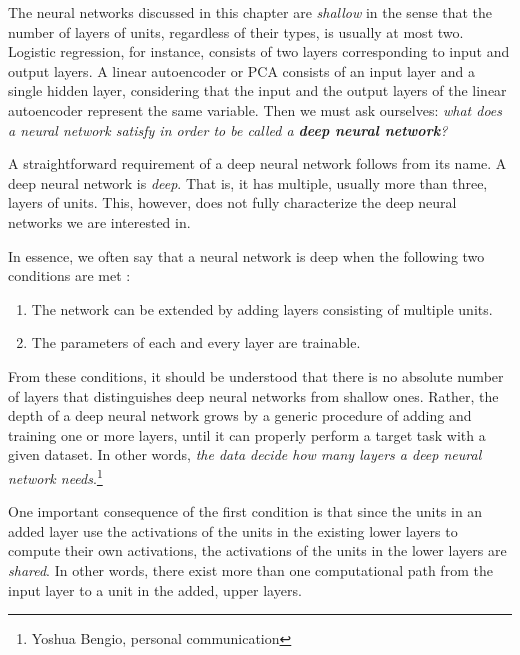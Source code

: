\documentclass[dissertation,nocontribution]{aaltoseries}
\begin{document}
The neural networks discussed in this chapter are
\textit{shallow} in the sense that the number of layers of
units, regardless of their types, is usually at most two.
Logistic regression, for instance, consists of two layers
corresponding to input and output layers. A linear
autoencoder or PCA consists of an input layer and a single
hidden layer, considering that the input and the output
layers of the linear autoencoder represent the same
variable. Then we must ask ourselves: \textit{what does a
neural network satisfy in order to be called a \textbf{deep
neural network}?}

A straightforward requirement of a deep neural network
follows from its name. A deep neural network is
\textit{deep}. That is, it has multiple, usually more than
three, layers of units.  This, however, does not fully
characterize the deep neural networks we are interested in.

In essence, we often say that a neural network is deep when
the following two conditions are met \citep[see,
e.g.,][]{Bengio2007a}:
\begin{enumerate}
    \itemsep 0em
    \item The network can be extended by adding layers consisting of multiple units.
    \item The parameters of each and every layer are trainable.
\end{enumerate}

From these conditions, it should be understood that there is
no absolute number of layers that distinguishes deep neural
networks from shallow ones. Rather, the depth of a deep
neural network grows by a generic procedure of adding and
training one or more layers, until it can properly perform a
target task with a given dataset. In other words,
\textit{the data decide how many layers a deep neural
network needs}.\footnote{Yoshua Bengio, personal
communication}

One important consequence of the first condition is that
since the units in an added layer use the activations of the
units in the existing lower layers to compute their own
activations, the activations of the units in the lower
layers are \textit{shared}.  In other words, there exist
more than one computational path from the input layer to a
unit in the added, upper layers.

\end{document}
